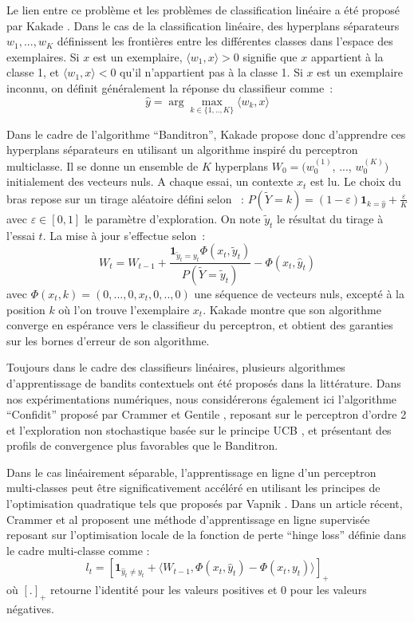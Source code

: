 \documentclass[twocolumn]{article}
\begin{document}
Le lien entre ce problème et les problèmes de classification linéaire a été proposé par Kakade \cite{kakade2008efficient}. Dans le cas de la classification linéaire, des hyperplans séparateurs $w_1, ..., w_K$ définissent les frontières entre les différentes classes dans l'espace des exemplaires.  
Si $x$ est un exemplaire, $\langle w_1, x \rangle > 0$ signifie que $x$ appartient à la classe 1, et $\langle w_1, x \rangle < 0$ qu'il n'appartient pas à la classe 1. Si $x$ est un exemplaire inconnu, on définit généralement la réponse du classifieur comme~:
$$\hat{y} = \arg \max_{k \in\{1,..,K\}}  \langle w_k, x \rangle$$
 
Dans le cadre de l'algorithme ``Banditron'', Kakade propose donc d'apprendre ces hyperplans séparateurs en utilisant un algorithme inspiré du perceptron multiclasse. Il se donne un ensemble de $K$ hyperplans $W_0 = (w^{(1)}_0$, ..., $w^{(K)}_0)$ initialement des vecteurs nuls. A chaque essai, un contexte $x_t$ est lu. Le choix du bras repose sur un tirage aléatoire défini selon~ : $P(\tilde{Y}=k) = (1 - \varepsilon) \mathbf{1}_{k = \hat{y}} + \frac{\varepsilon}{K} $ avec $\varepsilon \in [0,1]$ le paramètre d'exploration. On note $\tilde{y}_t$ le résultat du tirage à l'essai $t$. La mise à jour s'effectue selon~:
$$ W_t = W_{t-1} + \frac{\mathbf{1}_{\tilde{y}_t = y_t} \Phi(x_t,\tilde{y}_t)}{P(\tilde{Y}=\tilde{y}_t)} - \Phi(x_t,\hat{y}_t)$$   
avec $\Phi(x_t,k) = (0, ..., 0,  x_t, 0, .., 0)$ une séquence de vecteurs nuls, excepté à la position $k$ où l'on trouve l'exemplaire $x_t$. Kakade montre que son algorithme converge en espérance vers le classifieur du perceptron, et obtient des garanties sur les bornes d'erreur de son algorithme. 

Toujours dans le cadre des classifieurs linéaires, plusieurs algorithmes d'apprentissage de bandits contextuels ont été proposés dans la littérature. Dans nos expérimentations numériques, nous considérerons également ici l'algorithme ``Confidit'' proposé par Crammer et Gentile \cite{crammer2013multiclass}, reposant sur le perceptron d'ordre 2 et l'exploration non stochastique basée sur le principe UCB \cite{lai1985asymptotically}, et présentant des profils de convergence plus favorables que le Banditron. 


Dans le cas linéairement séparable, l'apprentissage en ligne d'un perceptron multi-classes peut être significativement accéléré en utilisant les principes de l'optimisation quadratique tels que proposés par Vapnik \cite{vapnik1998statistical}. Dans un article récent, Crammer et al \cite{crammer2006online} proposent une méthode d'apprentissage en ligne supervisée reposant sur l'optimisation locale de la fonction de perte ``hinge loss'' définie dans le cadre multi-classe comme : 
$$
	 l_t =[\mathbf{1}_{\hat{y}_t\neq y_t} + \langle W_{t-1}, \Phi(x_t,\hat{y}_t)- \Phi(x_t,y_t)\rangle]_+ 
$$
où $[.]_+$ retourne l'identité pour les valeurs positives et 0 pour les valeurs négatives. 
\end{document}
